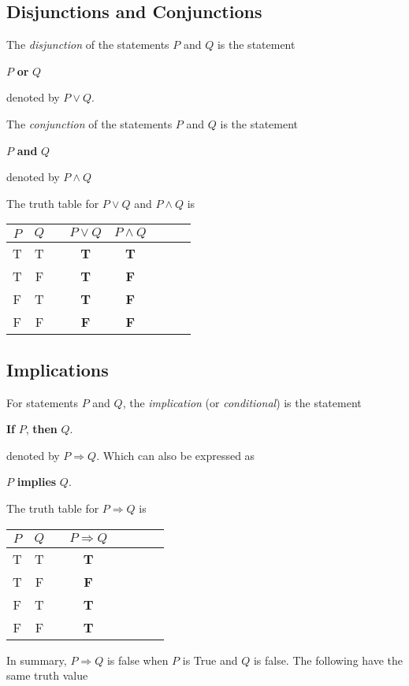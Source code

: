 \subsection{Disjunctions and Conjunctions}
\begin{defi}[Disjunction]
     The \emph{disjunction} of the statements $P$ and $Q$ is the statement
    \begin{center}
         $P$ \textbf{or} $Q$
    \end{center}
    denoted by $P \vee Q$.
\end{defi}
\begin{defi}
     The \emph{conjunction} of the statements $P$ and $Q$ is the statement
     \begin{center}
        $P$ \textbf{and} $Q$
     \end{center}
     denoted by $P \wedge Q$
\end{defi}
The truth table for $P \vee Q$ and $P \wedge Q$ is 
\begin{center}
    \begin{tabular}{cccccccc}
      \toprule
      $P$ & $Q$ &\quad &$P \vee Q$ &$P \wedge Q$ \\
      \midrule
      T & T & & \textbf{T} & \textbf{T} \\
      T & F & & \textbf{T} & \textbf{F} \\
      F & T & & \textbf{T} & \textbf{F} \\
      F & F & & \textbf{F} & \textbf{F} \\
      \bottomrule
    \end{tabular}
  \end{center}

\subsection{Implications}
\begin{defi}[Implication]
    For statements $P$ and $Q$, the \emph{implication}
    (or \emph{conditional}) is the statement
    \begin{center}
         \textbf{If} $P$, \textbf{then} $Q$.
    \end{center}
    denoted by $P \Rightarrow Q$. Which can also be expressed as
    \begin{center}
         $P$ \textbf{implies} $Q$.
    \end{center}
\end{defi}  
The truth table for $P \Rightarrow Q$ is 
\begin{center}
    \begin{tabular}{cccccccc}
      \toprule
      $P$ & $Q$ &\quad &$P \Rightarrow Q$  \\
      \midrule
      T & T & & \textbf{T} \\
      T & F & & \textbf{F} \\
      F & T & & \textbf{T} \\
      F & F & & \textbf{T} \\
      \bottomrule
    \end{tabular}
\end{center}   
In summary, $P \Rightarrow Q$ is false when $P$ is True and $Q$ is false.
\medbreak
The following have the same truth value

